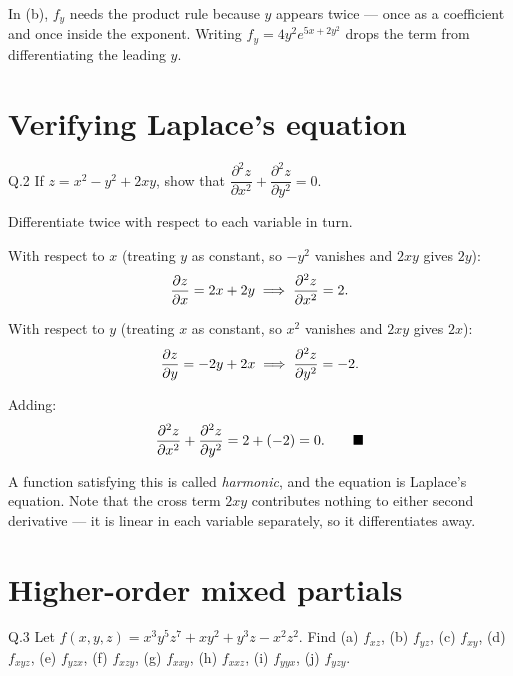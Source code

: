 \begin{pitfall}
In (b), $f_y$ needs the product rule because $y$ appears twice --- once as a
coefficient and once inside the exponent. Writing $f_y=4y^{2}e^{5x+2y^{2}}$
drops the term from differentiating the leading $y$.
\end{pitfall}

\section{Verifying Laplace's equation}

\begin{question}{Q.2}
If $z=x^{2}-y^{2}+2xy$, show that
$\dfrac{\partial^{2}z}{\partial x^{2}}+\dfrac{\partial^{2}z}{\partial y^{2}}=0$.
\end{question}

\begin{solution}
Differentiate twice with respect to each variable in turn.

\medskip
With respect to $x$ (treating $y$ as constant, so $-y^{2}$ vanishes and $2xy$
gives $2y$):
\[
\frac{\partial z}{\partial x}=2x+2y
\;\Longrightarrow\;
\frac{\partial^{2} z}{\partial x^{2}}=2 .
\]

With respect to $y$ (treating $x$ as constant, so $x^{2}$ vanishes and $2xy$
gives $2x$):
\[
\frac{\partial z}{\partial y}=-2y+2x
\;\Longrightarrow\;
\frac{\partial^{2} z}{\partial y^{2}}=-2 .
\]

Adding:
\[
\frac{\partial^{2} z}{\partial x^{2}}+\frac{\partial^{2} z}{\partial y^{2}}=2+(-2)=0 . \qquad\blacksquare
\]

\medskip
A function satisfying this is called \emph{harmonic}, and the equation is
Laplace's equation. Note that the cross term $2xy$ contributes nothing to either
second derivative --- it is linear in each variable separately, so it
differentiates away.

\end{solution}

\section{Higher-order mixed partials}

\begin{question}{Q.3}
Let $f(x,y,z)=x^{3}y^{5}z^{7}+xy^{2}+y^{3}z-x^{2}z^{2}$. Find
(a) $f_{xz}$, (b) $f_{yz}$, (c) $f_{xy}$, (d) $f_{xyz}$, (e) $f_{yzx}$,
(f) $f_{xzy}$, (g) $f_{xxy}$, (h) $f_{xxz}$, (i) $f_{yyx}$, (j) $f_{yzy}$.
\end{question}

